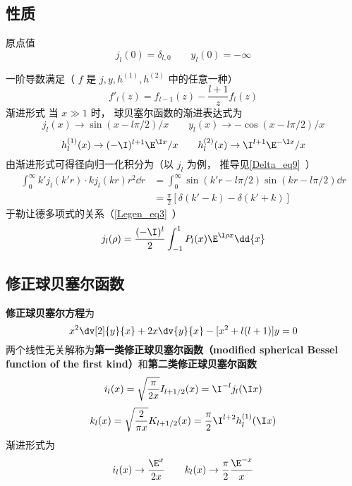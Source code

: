 \subsection{性质}
原点值
\begin{equation}
j_l(0) = \delta_{l,0} \qquad y_l(0) = -\infty
\end{equation}

一阶导数满足（ $f$ 是 $j, y, h^{(1)}, h^{(2)}$ 中的任意一种）
\begin{equation}
f'_l(z) = f_{l-1}(z) - \frac{l+1}{z} f_l(z)
\end{equation}
渐进形式
当 $x \gg 1$ 时， 球贝塞尔函数的渐进表达式为
\begin{equation}\label{SphBsl_eq2}
j_l(x) \to \sin(x - l\pi /2)/x
\qquad
y_l(x) \to  - \cos(x - l\pi /2)/x
\end{equation}
\begin{equation}
h_l^{(1)}(x) \to ( -\I)^{l+1} \E^{\I x}/x
\qquad
h_l^{(2)}(x) \to \I^{l + 1} \E^{-\I x}/x
\end{equation}
由渐进形式可得径向归一化积分为（以 $j_l$ 为例， 推导见\autoref{Delta_eq9}~）
\begin{equation}
\begin{aligned}
\int_0^\infty k'j_l(k'r) \cdot kj_l(kr) r^2 \dd{r} &= \int_0^\infty \sin(k'r - l\pi/2)\sin(kr - l\pi/2) \dd{r}\\
& = \frac{\pi}{2}[\delta(k'-k) - \delta(k'+k)]
\end{aligned}
\end{equation}
于勒让德多项式的关系（\autoref{Legen_eq3}~）
\begin{equation}
j_l(\rho) = \frac{(-\I)^l}{2} \int_{-1}^1 P_l(x) \E^{\I \rho x} \dd{x}
\end{equation}

\subsection{修正球贝塞尔函数}

\textbf{修正球贝塞尔方程}为
\begin{equation}
x^2 \dv[2]{y}{x} + 2x\dv{y}{x} - [x^2 + l(l + 1)]y = 0
\end{equation}
两个线性无关解称为\textbf{第一类修正球贝塞尔函数（modified spherical Bessel function of the first kind）}和\textbf{第二类修正球贝塞尔函数}
\begin{equation}
i_l(x) = \sqrt{\frac{\pi }{2x}} I_{l+1/2}(x) = \I^{-l} j_l(\I x)
\end{equation}
\begin{equation}\label{SphBsl_eq1}
k_l(x) = \sqrt{\frac{2}{\pi x}} K_{l+1/2}(x) = \frac{\pi }{2} \I^{l + 2} h_l^{(1)}(\I x)
\end{equation}
渐进形式为
\begin{equation}
i_l(x) \to \frac{\E^x}{2x}
\qquad
k_l(x) \to \frac{\pi}{2} \frac{\E^{-x}}{x}
\end{equation}
